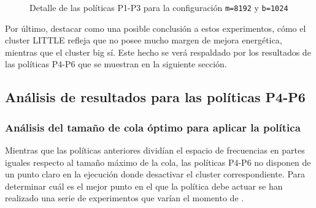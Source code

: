 \begin{figure}
    \begin{subfigure}{0.75\textwidth}
      \centering
      \caption{\odroid}
    \end{subfigure}  
  \caption{Detalle de las políticas P1-P3 para la configuración
    \texttt{m=8192} y \texttt{b=1024}}
  \label{fig:detalle:p1-p4}
\end{figure}

Por último, destacar como una posible conclusión a estos experimentos, cómo
el cluster LITTLE refleja que no posee mucho margen de mejora energética,
mientras que el cluster big sí. Este hecho se verá respaldado por los
resultados de las políticas P4-P6 que se muestran en la siguiente sección.


\subsection{Análisis de resultados para las políticas P4-P6}
\subsubsection{Análisis del tamaño de cola óptimo para aplicar la política}
Mientras que las políticas anteriores dividían el espacio de frecuencias en
partes iguales respecto al tamaño máximo de la cola, las políticas P4-P6 no
disponen de un punto claro en la ejecución donde desactivar el cluster
correspondiente. Para determinar cuál es el mejor punto en el que la
política debe actuar se han realizado una serie de experimentos que varían
el momento de .



